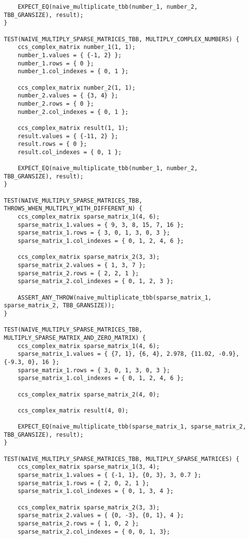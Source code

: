 \documentclass{report}
\begin{document}
\begin{itemize}
\begin{itemize}
\begin{lstlisting}
    EXPECT_EQ(naive_multiplicate_tbb(number_1, number_2, TBB_GRANSIZE), result);
}

TEST(NAIVE_MULTIPLY_SPARSE_MATRICES_TBB, MULTIPLY_COMPLEX_NUMBERS) {
    ccs_complex_matrix number_1(1, 1);
    number_1.values = { {-1, 2} };
    number_1.rows = { 0 };
    number_1.col_indexes = { 0, 1 };

    ccs_complex_matrix number_2(1, 1);
    number_2.values = { {3, 4} };
    number_2.rows = { 0 };
    number_2.col_indexes = { 0, 1 };

    ccs_complex_matrix result(1, 1);
    result.values = { {-11, 2} };
    result.rows = { 0 };
    result.col_indexes = { 0, 1 };

    EXPECT_EQ(naive_multiplicate_tbb(number_1, number_2, TBB_GRANSIZE), result);
}

TEST(NAIVE_MULTIPLY_SPARSE_MATRICES_TBB, THROWS_WHEN_MULTIPLY_WITH_DIFFERENT_N) {
    ccs_complex_matrix sparse_matrix_1(4, 6);
    sparse_matrix_1.values = { 9, 3, 8, 15, 7, 16 };
    sparse_matrix_1.rows = { 3, 0, 1, 3, 0, 3 };
    sparse_matrix_1.col_indexes = { 0, 1, 2, 4, 6 };

    ccs_complex_matrix sparse_matrix_2(3, 3);
    sparse_matrix_2.values = { 1, 3, 7 };
    sparse_matrix_2.rows = { 2, 2, 1 };
    sparse_matrix_2.col_indexes = { 0, 1, 2, 3 };

    ASSERT_ANY_THROW(naive_multiplicate_tbb(sparse_matrix_1, sparse_matrix_2, TBB_GRANSIZE));
}

TEST(NAIVE_MULTIPLY_SPARSE_MATRICES_TBB, MULTIPLY_SPARSE_MATRIX_AND_ZERO_MATRIX) {
    ccs_complex_matrix sparse_matrix_1(4, 6);
    sparse_matrix_1.values = { {7, 1}, {6, 4}, 2.978, {11.02, -0.9}, {-9.3, 0}, 16 };
    sparse_matrix_1.rows = { 3, 0, 1, 3, 0, 3 };
    sparse_matrix_1.col_indexes = { 0, 1, 2, 4, 6 };

    ccs_complex_matrix sparse_matrix_2(4, 0);

    ccs_complex_matrix result(4, 0);

    EXPECT_EQ(naive_multiplicate_tbb(sparse_matrix_1, sparse_matrix_2, TBB_GRANSIZE), result);
}

TEST(NAIVE_MULTIPLY_SPARSE_MATRICES_TBB, MULTIPLY_SPARSE_MATRICES) {
    ccs_complex_matrix sparse_matrix_1(3, 4);
    sparse_matrix_1.values = { {-1, 1}, {0, 3}, 3, 0.7 };
    sparse_matrix_1.rows = { 2, 0, 2, 1 };
    sparse_matrix_1.col_indexes = { 0, 1, 3, 4 };

    ccs_complex_matrix sparse_matrix_2(3, 3);
    sparse_matrix_2.values = { {0, -3}, {0, 1}, 4 };
    sparse_matrix_2.rows = { 1, 0, 2 };
    sparse_matrix_2.col_indexes = { 0, 0, 1, 3};


\end{lstlisting}
\end{itemize}
\end{itemize}
\end{document}

